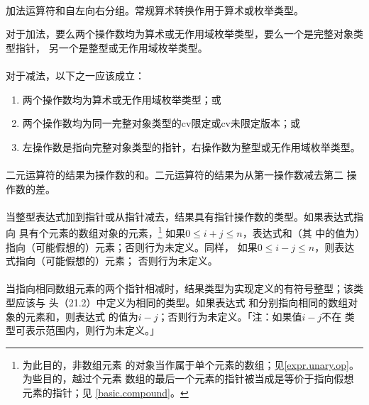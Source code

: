 \paragraph{}
加法运算符\tm{+}和\tm{-}自左向右分组。常规算术转换作用于算术或枚举类型。


对于加法，要么两个操作数均为算术或无作用域枚举类型，要么一个是完整对象类型指针，
另一个是整型或无作用域枚举类型。

\paragraph{}
对于减法，以下之一应该成立：
\begin{enumerate}
  \item{两个操作数均为算术或无作用域枚举类型；或}
  \item{两个操作数均为同一完整对象类型的cv限定或cv未限定版本；或}
  \item{左操作数是指向完整对象类型的指针，右操作数为整型或无作用域枚举类型。}
\end{enumerate}

\paragraph{}
二元\tm{+}运算符的结果为操作数的和。二元\tm{-}运算符的结果为从第一操作数减去第二
操作数的差。

\paragraph{}
当整型表达式加到指针或从指针减去，结果具有指针操作数的类型。如果表达式指向
具有个元素的数组对象的元素，\footnote{为此目的，非数组元素
的对象当作属于单个元素的数组；见\ref{expr.unary.op}。为些目的，越过个元素
数组的最后一个元素的指针被当成是等价于指向假想元素的指针；见
\ref{basic.compound}。} 如果$0 \le i+j \le n$，表达式和（其
中的值为）指向（可能假想的）元素；否则行为未定义。同样，
如果$0 \le i - j \le n$，则表达式指向（可能假想的）元素；
否则行为未定义。

\paragraph{}
当指向相同数组元素的两个指针相减时，结果类型为实现定义的有符号整型；该类型应该与
头（21.2）中定义为相同的类型。如果表达式
和分别指向相同的数组对象的元素和，则表达式
的值为$i - j$；否则行为未定义。「注：如果值$i - j$不在
类型可表示范围内，则行为未定义。」

